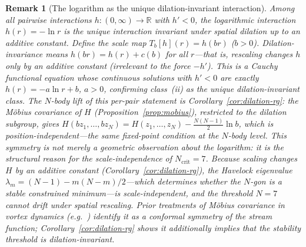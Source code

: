 \documentclass[12pt, a4paper]{article}
\newtheorem{remark}{Remark}[section]
\numberwithin{equation}{section}
\begin{document}
\begin{remark}[The logarithm as the unique dilation-invariant interaction]
\label{rem:rg-fixed-point}
Among all pairwise interactions $h:(0,\infty)\to\mathbb{R}$ with
$h'<0$, the logarithmic interaction $h(r)=-\ln r$ is the
\emph{unique interaction invariant under spatial dilation up to an
additive constant}.  Define the scale map $T_b[h](r) = h(br)$
($b>0$).  Dilation-invariance means $h(br) = h(r) + c(b)$ for
all $r$---that is, rescaling changes $h$ only by an additive constant
(irrelevant to the force $-h'$).  This is a Cauchy functional equation
whose continuous solutions with $h'<0$ are exactly $h(r)=-a\ln r + b$,
$a>0$, confirming class~(ii) as the unique dilation-invariant class.
The $N$-body lift of this per-pair statement is
Corollary~\ref{cor:dilation-rg}: the M\"obius covariance of $H$
(Proposition~\ref{prop:mobius}), restricted to the dilation subgroup,
gives $H(bz_1,\dots,bz_N)=H(z_1,\dots,z_N)-\tfrac{N(N-1)}{2}\ln b$,
which is position-independent---the same fixed-point condition at the
$N$-body level.
This symmetry is not merely a geometric observation about the
logarithm: it is the structural reason for the \emph{scale-independence}
of $N_{\mathrm{crit}}=7$.  Because scaling changes $H$ by an
additive constant (Corollary~\ref{cor:dilation-rg}), the Havelock
eigenvalue $\lambda_m = (N{-}1) - m(N{-}m)/2$---which determines
whether the $N$-gon is a stable constrained minimum---is
scale-independent, and the threshold $N=7$ cannot drift under
spatial rescaling.  Prior treatments of M\"obius covariance in vortex
dynamics (e.g.\ \citealt{Newton2001}) identify it as a conformal
symmetry of the stream function; Corollary~\ref{cor:dilation-rg}
shows it additionally implies that the stability threshold is
dilation-invariant.


\end{remark}
\end{document}
